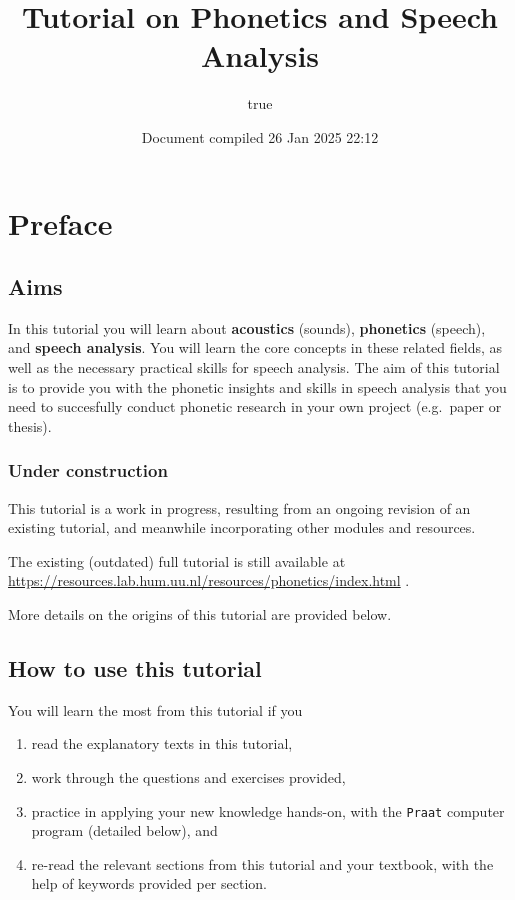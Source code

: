 \documentclass[
]{book}
\title{Tutorial on Phonetics and Speech Analysis}
\author{true}
\date{Document compiled 26 Jan 2025 22:12}
\providecommand{\tightlist}{%
  \setlength{\itemsep}{0pt}\setlength{\parskip}{0pt}}
\begin{document}
\maketitle

{
\setcounter{tocdepth}{1}
\tableofcontents
}
\chapter*{Preface}\label{preface}

\section*{Aims}\label{aims}

In this tutorial you will learn about \textbf{acoustics} (sounds), \textbf{phonetics} (speech), and \textbf{speech analysis}.
You will learn the core concepts in these related fields, as well as the necessary practical skills for speech analysis.
The aim of this tutorial is to provide you with the phonetic insights and skills in speech analysis that you need to succesfully conduct phonetic research in your own project (e.g.~paper or thesis).

\subsection*{Under construction}\label{under-construction}

This tutorial is a work in progress, resulting from an ongoing revision of an existing tutorial, and meanwhile incorporating other modules and resources.

The existing (outdated) full tutorial is still available at \url{https://resources.lab.hum.uu.nl/resources/phonetics/index.html}
.

More details on the origins of this tutorial are provided below.

\section*{How to use this tutorial}\label{how-to-use-this-tutorial}

You will learn the most from this tutorial if you

\begin{enumerate}
\def\labelenumi{(\arabic{enumi})}
\tightlist
\item
  read the explanatory texts in this tutorial,
\item
  work through the questions and exercises provided,
\item
  practice in applying your new knowledge hands-on, with the \texttt{Praat} computer program (detailed below), and
\item
  re-read the relevant sections from this tutorial and your textbook, with the help of keywords provided per section.
\end{enumerate}
\end{document}
